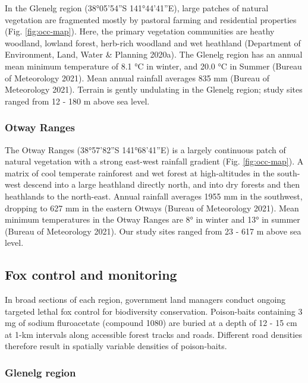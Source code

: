 \documentclass[11pt,a4paper,titlepage,twoside,openright]{style/unimelbthesis}
\begin{document}
\begin{mainmatter}
In the Glenelg region (38°05'54''S 141°44'41''E), large patches of natural vegetation are fragmented mostly by pastoral farming and residential properties (Fig. \ref{fig:occ-map}). Here, the primary vegetation communities are heathy woodland, lowland forest, herb-rich woodland and wet heathland (Department of Environment, Land, Water \& Planning 2020a). The Glenelg region has an annual mean minimum temperature of 8.1 °C in winter, and 20.0 °C in Summer (Bureau of Meteorology 2021). Mean annual rainfall averages 835 mm (Bureau of Meteorology 2021). Terrain is gently undulating in the Glenelg region; study sites ranged from 12 - 180 m above sea level.

\hypertarget{otway-ranges}{%
\subsubsection{Otway Ranges}\label{otway-ranges}}

The Otway Ranges (38°57'82''S 141°68'41''E) is a largely continuous patch of natural vegetation with a strong east-west rainfall gradient (Fig. \ref{fig:occ-map}). A matrix of cool temperate rainforest and wet forest at high-altitudes in the south-west descend into a large heathland directly north, and into dry forests and then heathlands to the north-east. Annual rainfall averages 1955 mm in the southwest, dropping to 627 mm in the eastern Otways (Bureau of Meteorology 2021). Mean minimum temperatures in the Otway Ranges are 8° in winter and 13° in summer (Bureau of Meteorology 2021). Our study sites ranged from 23 - 617 m above sea level.

\hypertarget{fox-control-and-monitoring}{%
\subsection{Fox control and monitoring}\label{fox-control-and-monitoring}}

In broad sections of each region, government land managers conduct ongoing targeted lethal fox control for biodiversity conservation. Poison-baits containing 3 mg of sodium fluroacetate (compound 1080) are buried at a depth of 12 - 15 cm at 1-km intervals along accessible forest tracks and roads. Different road densities therefore result in spatially variable densities of poison-baits.

\hypertarget{glenelg-region-1}{%
\subsubsection{Glenelg region}\label{glenelg-region-1}}


\end{mainmatter}
\end{document}
